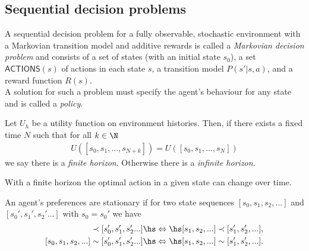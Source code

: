 \documentclass{article}
\begin{document}
\subsection{Sequential decision problems}

\begin{definition}
	A sequential decision problem for a fully observable, stochastic environment
	with a Markovian transition model and additive rewards is called a \emph{Markovian
		decision problem} and consists of a set of states (with an initial state $s_0$),
	a set $\textsf{ACTIONS}(s)$ of
	actions in each state $s$, a transition model $P(s'|s,a)$, and a reward function
	$R(s)$.\\
	A solution for such a problem must specify the agent's behaviour for any state
	and is called a \emph{policy}.
\end{definition}

\begin{definition}[R\&N p. 648]
	Let $U_h$ be a utility function on environment histories. Then, if there exists
	a fixed time $N$ such that for all $k\in\N$
	\begin{align*}
		U([s_0,s_1,...,s_{N+k}]) = U([s_0,s_1,...,s_N])
	\end{align*}
	we say there is a \emph{finite horizon}. Otherwise there is a \emph{infinite
		horizon}.
\end{definition}

\begin{theorem}
	With a finite horizon the optimal action in a given state can change over time.
\end{theorem}

\begin{definition}[R\&N p. 649]
	An agent's preferences are stationary if for two state sequences
	$[s_0, s_1, s_2, ...]$ and $[s_0', s_1', s_2'...]$ with $s_0=s_0'$ we have
	\begin{align*}
		[s_0, s_1, s_2, ...] \prec [s_0', s_1', s_2'...]\hs & \Leftrightarrow\hs
		[s_1, s_2, ...] \prec [s_1', s_2', ...],                                 \\
		[s_0, s_1, s_2, ...] \sim [s_0', s_1', s_2'...]\hs  & \Leftrightarrow\hs
		[s_1, s_2, ...] \sim [s_1', s_2', ...].
	\end{align*}
\end{definition}
\end{document}
